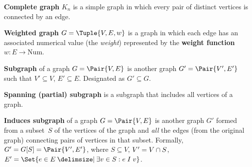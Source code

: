 \documentclass[a4paper,10pt]{article}
\begin{document}
\begin{terms}
    \item \textbf{Complete graph} $K_n$ is a simple graph in which every pair of distinct vertices is connected by an edge.

    \item \textbf{Weighted graph} $G = \Tuple{V, E, w}$ is a graph in which each edge has an associated numerical value (the \emph{weight}) represented by the \textbf{weight function} $w: E \to \mathrm{Num}$.

    \item \textbf{Subgraph} of a graph $G = \Pair{V,E}$ is another graph $G' = \Pair{V',E'}$ such that $V' \subseteq V$, $E' \subseteq E$. Designated as $G' \subseteq G$.

    \item \textbf{Spanning (partial) subgraph} is a subgraph that includes all vertices of a graph.

    \item \textbf{Induces subgraph} of a graph $G = \Pair{V,E}$ is another graph $G'$ formed from a subset~$S$ of the vertices of the graph and \emph{all} the edges (from the original graph) connecting pairs of vertices in that subset.
    Formally, $G' = G[S] = \Pair{V',E'}$, where $S \subseteq V$, $V' = V \cap S$, $E' = \Set{e \in E \given \exists v \in S: e \mathrel{I} v}$.

    \begin{minipage}{\linewidth}


\end{minipage}
\end{terms}
\end{document}
